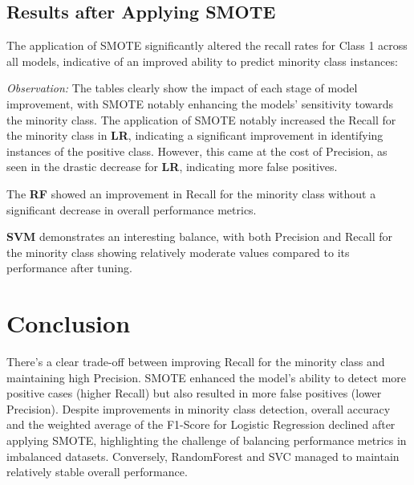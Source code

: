 \documentclass[12pt, twocolumn]{article}
\begin{document}
	\subsection{Results after Applying SMOTE}
	
	The application of SMOTE significantly altered the recall rates for Class 1 across all models, indicative of an improved ability to predict minority class instances:
	
	\begin{table}[H]
		\centering
		\caption{Class 1 Performance Metrics After SMOTE Application}
		\label{tab:smote-results-class1}
	\end{table}
	
	
	\textit{Observation:} The tables clearly show the impact of each stage of model improvement, with SMOTE notably enhancing the models' sensitivity towards the minority class. The application of SMOTE notably increased the Recall for the minority class in \textbf{LR}, indicating a significant improvement in identifying instances of the positive class. However, this came at the cost of Precision, as seen in the drastic decrease for \textbf{LR}, indicating more false positives.
	
	The \textbf{RF} showed an improvement in Recall for the minority class without a significant decrease in overall performance metrics.
	
	\textbf{SVM} demonstrates an interesting balance, with both Precision and Recall for the minority class showing relatively moderate values compared to its performance after tuning.
	
	\section{Conclusion}
	There's a clear trade-off between improving Recall for the minority class and maintaining high Precision. SMOTE enhanced the model's ability to detect more positive cases (higher Recall) but also resulted in more false positives (lower Precision). Despite improvements in minority class detection, overall accuracy and the weighted average of the F1-Score for Logistic Regression declined after applying SMOTE, highlighting the challenge of balancing performance metrics in imbalanced datasets. Conversely, RandomForest and SVC managed to maintain relatively stable overall performance. 
	
\end{document}
